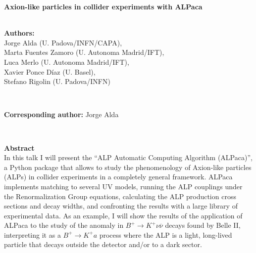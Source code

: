 \documentclass[combined.tex]{subfiles}
\begin{document}
{\large\textbf{Axion-like particles in collider experiments with ALPaca}}\\

~

\textbf{Authors:}\\Jorge Alda (U. Padova/INFN/CAPA),\\ Marta Fuentes Zamoro (U. Autonoma Madrid/IFT),\\ Luca Merlo (U. Autonoma Madrid/IFT),\\ Xavier Ponce D\'iaz (U. Basel),\\ Stefano Rigolin (U. Padova/INFN)

~

\textbf{Corresponding author:} Jorge Alda

~

\textbf{Abstract}\\
In this talk I will present the ``ALP Automatic Computing Algorithm (ALPaca)'', a Python package that allows to study the phenomenology of Axion-like particles (ALPs) in collider experiments in a completely general framework. ALPaca implements matching to several UV models, running the ALP couplings under the Renormalization Group equations, calculating the ALP production cross sections and decay widths, and confronting the results with a large library of experimental data. As an example, I will show the results of the application of ALPaca to the study of the anomaly in $B^+\to K^+ \nu \overline{\nu}$ decays found by Belle II, interpreting it as a $B^+\to K^+ a$ process where the ALP is a light, long-lived particle that decays outside the detector and/or to a dark sector.
\end{document}
